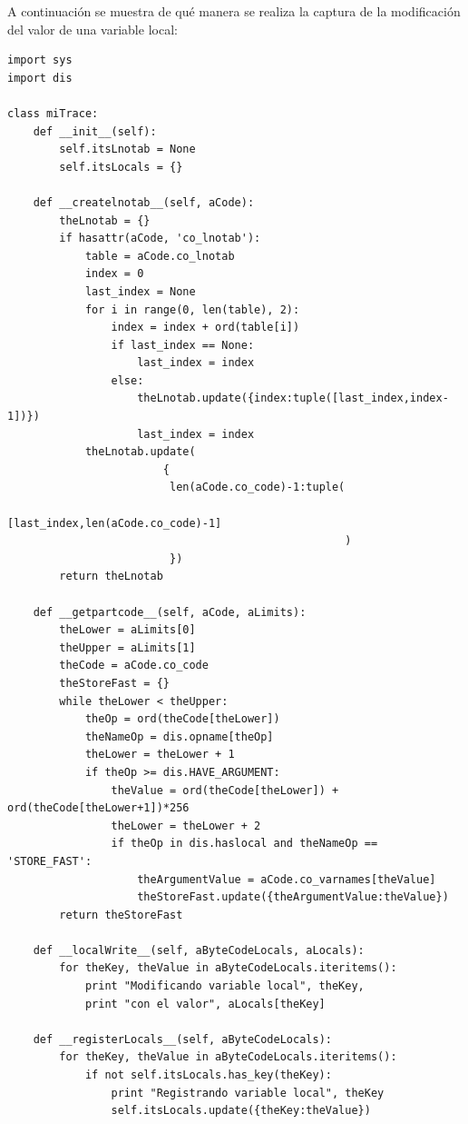 \documentclass[12pt,legalpaper]{report}
\begin{document}
A continuación se muestra de qué manera se realiza la captura de la modificación del valor de una variable local:

\begin{singlespace}
\begin{lstlisting}[style=Python]
import sys
import dis

class miTrace:
    def __init__(self):
        self.itsLnotab = None
        self.itsLocals = {}

    def __createlnotab__(self, aCode):
        theLnotab = {}
        if hasattr(aCode, 'co_lnotab'):
            table = aCode.co_lnotab
            index = 0
            last_index = None
            for i in range(0, len(table), 2):
                index = index + ord(table[i])
                if last_index == None:
                    last_index = index
                else:
                    theLnotab.update({index:tuple([last_index,index-1])})                
                    last_index = index
            theLnotab.update(
                        {
                         len(aCode.co_code)-1:tuple(
                                            [last_index,len(aCode.co_code)-1]
                                                    )
                         })                
        return theLnotab 
    
    def __getpartcode__(self, aCode, aLimits):
        theLower = aLimits[0]
        theUpper = aLimits[1]
        theCode = aCode.co_code
        theStoreFast = {}    
        while theLower < theUpper:
            theOp = ord(theCode[theLower])
            theNameOp = dis.opname[theOp]
            theLower = theLower + 1
            if theOp >= dis.HAVE_ARGUMENT:
                theValue = ord(theCode[theLower]) + ord(theCode[theLower+1])*256
                theLower = theLower + 2
                if theOp in dis.haslocal and theNameOp == 'STORE_FAST':
                    theArgumentValue = aCode.co_varnames[theValue]
                    theStoreFast.update({theArgumentValue:theValue})
        return theStoreFast
    
    def __localWrite__(self, aByteCodeLocals, aLocals):
        for theKey, theValue in aByteCodeLocals.iteritems():
            print "Modificando variable local", theKey,
            print "con el valor", aLocals[theKey]

    def __registerLocals__(self, aByteCodeLocals):
        for theKey, theValue in aByteCodeLocals.iteritems():
            if not self.itsLocals.has_key(theKey):
                print "Registrando variable local", theKey
                self.itsLocals.update({theKey:theValue})


\end{lstlisting}
\end{singlespace}
\end{document}
